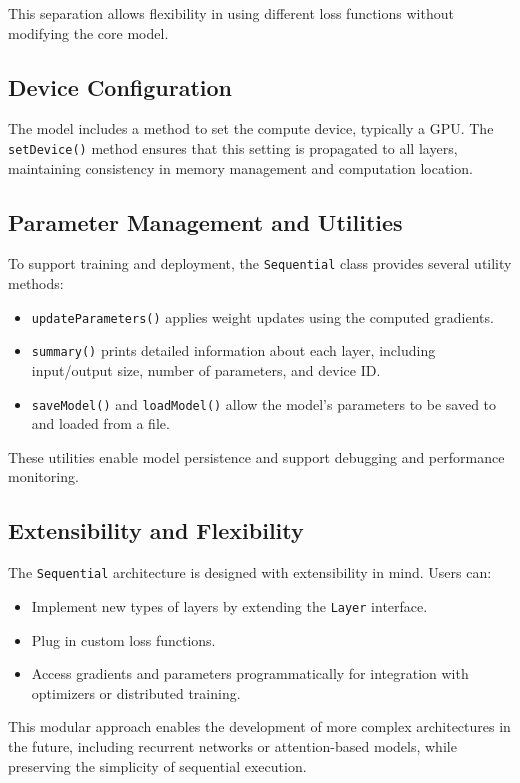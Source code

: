 This separation allows flexibility in using different loss functions without modifying the core model.

\subsection{Device Configuration}

The model includes a method to set the compute device, typically a GPU. The \texttt{setDevice()} method ensures that this setting is propagated to all layers, maintaining consistency in memory management and computation location.

\subsection{Parameter Management and Utilities}

To support training and deployment, the \texttt{Sequential} class provides several utility methods:
\begin{itemize}
    \item \texttt{updateParameters()} applies weight updates using the computed gradients.
    \item \texttt{summary()} prints detailed information about each layer, including input/output size, number of parameters, and device ID.
    \item \texttt{saveModel()} and \texttt{loadModel()} allow the model's parameters to be saved to and loaded from a file.
\end{itemize}

These utilities enable model persistence and support debugging and performance monitoring.

\subsection{Extensibility and Flexibility}

The \texttt{Sequential} architecture is designed with extensibility in mind. Users can:
\begin{itemize}
    \item Implement new types of layers by extending the \texttt{Layer} interface.
    \item Plug in custom loss functions.
    \item Access gradients and parameters programmatically for integration with optimizers or distributed training.
\end{itemize}

This modular approach enables the development of more complex architectures in the future, including recurrent networks or attention-based models, while preserving the simplicity of sequential execution.




